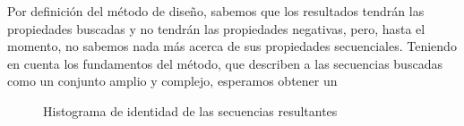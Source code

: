 Por definición del método de diseño, sabemos que los resultados tendrán las propiedades buscadas y no tendrán las propiedades negativas, pero, hasta el momento, no sabemos nada más acerca de sus propiedades secuenciales.
Teniendo en cuenta los fundamentos del método, que describen a las secuencias buscadas como un conjunto amplio y complejo, esperamos obtener un 




\begin{figure}[htbp]
\centering
{}
\caption{Histograma de identidad de las secuencias resultantes}
\label{fig:identity}
\end{figure}
% 


